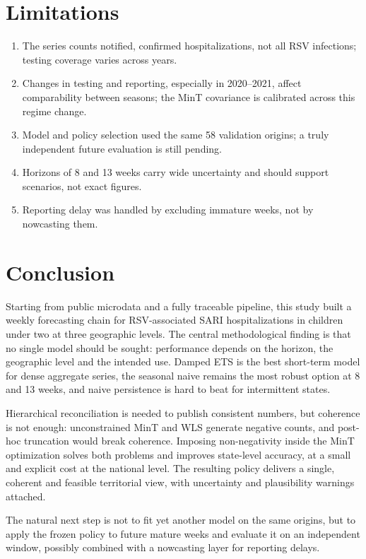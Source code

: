 \documentclass[12pt,a4paper]{article}
\begin{document}
\section{Limitations}
\begin{enumerate}\setlength\itemsep{0pt}
\item The series counts notified, confirmed hospitalizations, not all RSV infections; testing coverage varies across years.
\item Changes in testing and reporting, especially in 2020--2021, affect comparability between seasons; the MinT covariance is calibrated across this regime change.
\item Model and policy selection used the same 58 validation origins; a truly independent future evaluation is still pending.
\item Horizons of 8 and 13 weeks carry wide uncertainty and should support scenarios, not exact figures.
\item Reporting delay was handled by excluding immature weeks, not by nowcasting them.
\end{enumerate}

\section{Conclusion}\label{sec:conc}

Starting from public microdata and a fully traceable pipeline, this study built a weekly forecasting chain for RSV-associated SARI hospitalizations in children under two at three geographic levels. The central methodological finding is that no single model should be sought: performance depends on the horizon, the geographic level and the intended use. Damped ETS is the best short-term model for dense aggregate series, the seasonal naive remains the most robust option at 8 and 13 weeks, and naive persistence is hard to beat for intermittent states.

Hierarchical reconciliation is needed to publish consistent numbers, but coherence is not enough: unconstrained MinT and WLS generate negative counts, and post-hoc truncation would break coherence. Imposing non-negativity inside the MinT optimization solves both problems and improves state-level accuracy, at a small and explicit cost at the national level. The resulting policy delivers a single, coherent and feasible territorial view, with uncertainty and plausibility warnings attached.

The natural next step is not to fit yet another model on the same origins, but to apply the frozen policy to future mature weeks and evaluate it on an independent window, possibly combined with a nowcasting layer for reporting delays.
\end{document}
